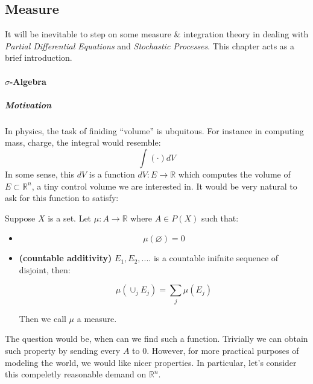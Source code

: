 \subsection{Measure}

It will be inevitable to step on some measure \& integration theory in dealing with \textit{Partial Differential Equations} and \textit{Stochastic Processes}. This chapter acts as a brief introduction.

\paragraph{$\sigma$-Algebra}

\subparagraph{Motivation}

In physics, the task of finiding ``volume'' is ubquitous. For instance in computing mass, charge, the integral would resemble:
\begin{equation}
\int (\cdot ) dV
\end{equation}
In some sense, this $dV$ is a function $dV:E\to \mathbb{R}$ which computes the volume of $E\subset \mathbb{R}^n$, a tiny control volume we are interested in.  It would be very natural to ask for this function to satisfy:

\begin{definition}[Measure]Suppose $X$ is a set. Let $\mu: A \to \mathbb{R}$ where $A\in P(X)$ such that:

\begin{itemize}
\item \begin{equation}
\mu(\varnothing)=0
\end{equation}


\item \textbf{(countable additivity)} $E_1,E_2,....$ is a countable inifnite sequence of disjoint, then:

\begin{equation}
\mu(\cup_j E_j)=\sum_j \mu(E_j)
\end{equation}


Then we call $\mu$ a measure.
\end{itemize}

\end{definition}The question would be, when can we find such a function. Trivially we can obtain such property by sending every $A$ to 0. However, for more practical purposes of modeling the world, we would like nicer properties. In particular, let's consider this compeletly reasonable demand on $\mathbb{R}^n$.

